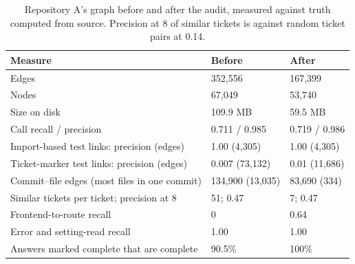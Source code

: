 \begin{table}[t]\centering\footnotesize
\caption{Repository A's graph before and after the audit, measured against truth computed from source. Precision at 8 of similar tickets is against random ticket pairs at 0.14.}
\label{tab:audit}
\setlength{\tabcolsep}{3pt}
\begin{tabular}{@{}p{}p{}p{}@{}}\toprule
Measure & Before & After \\\midrule
Edges & 352,556 & 167,399 \\
Nodes & 67,049 & 53,740 \\
Size on disk & 109.9 MB & 59.5 MB \\
Call recall / precision & 0.711 / 0.985 & 0.719 / 0.986 \\
Import-based test links: precision (edges) & 1.00 (4,305) & 1.00 (4,305) \\
Ticket-marker test links: precision (edges) & 0.007 (73,132) & 0.01 (11,686) \\
Commit--file edges (most files in one commit) & 134,900 (13,035) & 83,690 (334) \\
Similar tickets per ticket; precision at 8 & 51; 0.47 & 7; 0.47 \\
Frontend-to-route recall & 0 & 0.64 \\
Error and setting-read recall & 1.00 & 1.00 \\
Answers marked complete that are complete & 90.5\% & 100\% \\\bottomrule
\end{tabular}
\end{table}
